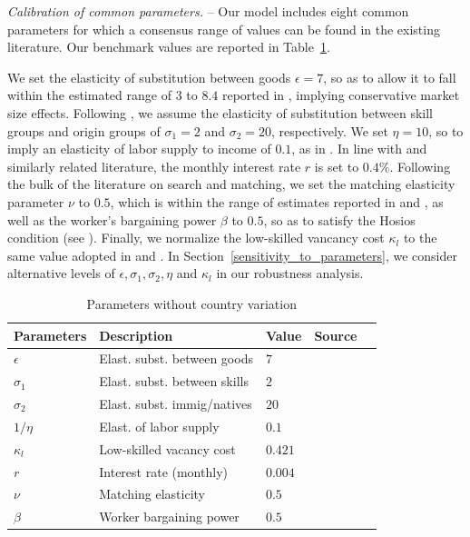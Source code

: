 \documentclass[a4paper,12pt]{article}
\begin{document}
\emph{Calibration of common parameters.} -- Our model includes eight common parameters for which a consensus range of values can be found in the existing literature. Our benchmark values are reported in Table~\ref{tab:general_parameters}.

We set the elasticity of substitution between goods $\epsilon=7$, so as to allow it to fall within the estimated range of $3$ to $8.4$ reported in \citet{Feenstra1994}, implying conservative market size effects. Following \citet{Ottaviano2012}, we assume the elasticity of substitution between skill groups and origin groups of $\sigma_1 =2$ and $\sigma_2 =20$, respectively. We set $\eta=10$, so to imply an elasticity of labor supply to income of $0.1$, as in \citet{Evers2008}. In line with \citet{Chassamboulli2014} and similarly related literature, the monthly interest rate $r$ is set to $0.4\%$. Following the bulk of the literature on search and matching, we set the matching elasticity parameter $\nu$ to $0.5$, which is within the range of estimates reported in \citet{Petrongolo2001} and \citet{Mortensen2007}, as well as the worker's bargaining power $\beta$ to $0.5$, so as to satisfy the Hosios condition (see \citet{Hosios1990}). Finally, we normalize the low-skilled vancancy cost $\kappa_l$ to the same value adopted in \citet{Chassamboulli2014} and \citet{Battisti2018}. In Section~\ref{sensitivity_to_parameters}, we consider alternative levels of $\epsilon, \sigma_1,\sigma_2, \eta$ and $\kappa_l$ in our robustness analysis.

\begin{table}[htb!]
\centering
\par
\caption{Parameters without country variation}
\label{tab:general_parameters}
\footnotesize
\begin{tabular}{lllll}
\hline\hline
Parameters & Description & Value & Source \\ \hline
$\epsilon $ & Elast. subst. between goods & $7$ & \cite{Feenstra1994}\\
$\sigma_1$ & Elast. subst. between skills & $2$ & \cite{Ottaviano2012}\\
$\sigma_2$ & Elast. subst. immig/natives & $20$ & \cite{Ottaviano2012}\\
$1/ \eta$ & Elast. of labor supply & $0.1$ & \cite{Evers2008}\\
$\kappa_l$ & Low-skilled vacancy cost & $0.421$ & \cite{Chassamboulli2014}\\
$r$ & Interest rate (monthly) & $0.004$ & \cite{Chassamboulli2014}\\
$\nu$ & Matching elasticity & $0.5$ & \cite{Petrongolo2001}\\
$ \beta$ & Worker bargaining power & $0.5$ & \cite{Hosios1990}\\
 \hline\hline
\end{tabular}
\end{table}
\end{document}
